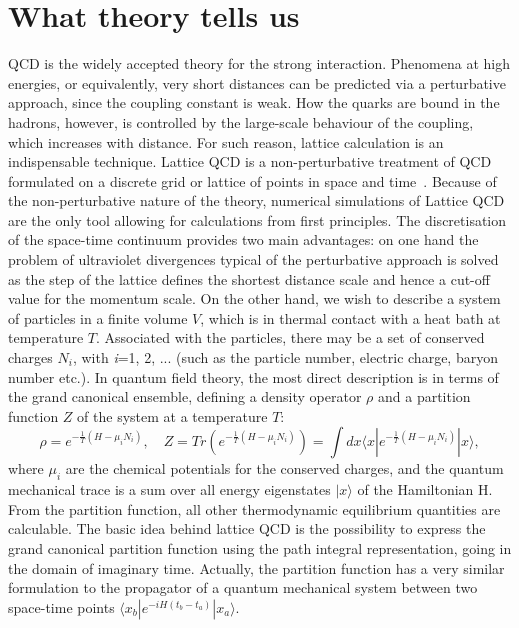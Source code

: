 \section{What theory tells us}
\label{sec:Lattice}
QCD is the widely accepted theory for the strong interaction. 
Phenomena at high energies, or equivalently, very short distances can be
predicted via a perturbative approach, since the coupling constant is weak. 
How the quarks are bound in the hadrons, however, is controlled by 
the large-scale behaviour of the coupling, which increases with distance. 
For such reason, lattice calculation is an indispensable technique. 
Lattice QCD is a non-perturbative treatment of QCD formulated 
on a discrete grid or lattice of points in space and time~\cite{Philipsen:2012nu}. 
Because of the non-perturbative nature of the theory, 
numerical simulations of Lattice QCD are the only tool 
allowing for calculations from first principles. The discretisation of the 
space-time continuum provides two main 
advantages: on one hand the problem of ultraviolet divergences typical 
of the perturbative approach is solved 
as the step of the lattice defines the shortest distance scale and hence a 
cut-off value for the momentum scale. 
On the other hand, we wish to describe a system of particles in a finite 
volume $V$, which is in thermal contact 
with a heat bath at temperature $T$. Associated with the particles, there 
may be a set of conserved charges 
$N_i$, with \textit{i}=1, 2, ... (such as the particle number, electric charge, 
baryon number etc.). In quantum field 
theory, the most direct description is in terms of the grand canonical ensemble, 
defining a density operator $\rho$ and a partition function $Z$ of the system at a temperature $T$:
\begin{equation}
\rho =e^{-\frac{1}{T}(H-\mu_iN_i)},\quad Z=Tr(e^{-\frac{1}{T}(H-\mu_iN_i)})=  \int dx \langle x|e^{-\frac{1}{T}(H-\mu_iN_i)}|x\rangle,
\end{equation}
where $\mu_i$ are the chemical potentials for the conserved charges, and 
the quantum mechanical trace is a sum over 
all energy eigenstates $|x\rangle$ of the Hamiltonian H. 
From the partition function, all other thermodynamic equilibrium quantities are 
calculable. The basic idea behind lattice 
QCD is the possibility to express the grand canonical partition function using the 
path integral representation, going in the 
domain of imaginary time. Actually, the partition function has a very similar 
formulation to the propagator of a quantum 
mechanical system between two space-time points $\langle x_b|e^{-iH(t_b-t_a)}|x_a\rangle$. 
